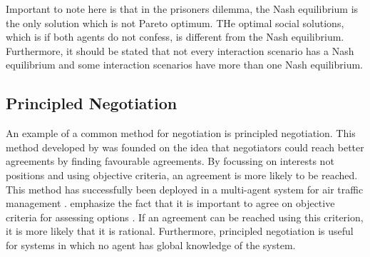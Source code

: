 Important to note here is that in the prisoners dilemma, the Nash equilibrium is the only solution which is not Pareto optimum.  THe optimal social solutions, which is if both agents do not confess, is different from the Nash equilibrium.  Furthermore, it should be stated that not every interaction scenario has a Nash equilibrium and some interaction scenarios have more than one Nash equilibrium. 
\subsection{Principled Negotiation}
\label{sec:principlednegotiation}
An example of a common method for negotiation is principled negotiation. This method developed by \citet{fisher1987getting} was founded on the idea that negotiators could reach better agreements by finding favourable agreements. By focussing on interests not positions and using objective criteria, an agreement is more likely to be reached. This method has successfully been deployed in a multi-agent system for air traffic management \citep{wangermann1998principled}. \citet{fisher1987getting} emphasize the fact that it is important to agree on objective criteria for assessing options \citep{fisher1987getting}. If an agreement can be reached using this criterion, it is more likely that it is rational. Furthermore, principled negotiation is useful for systems in which no agent has global knowledge of the system.








